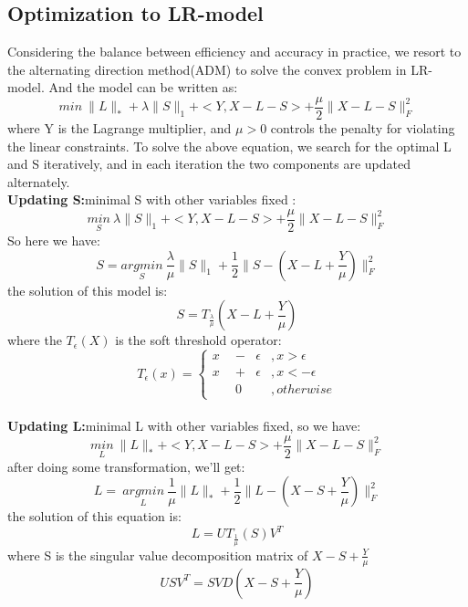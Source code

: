 \documentclass{article}
\begin{document}
\subsection{Optimization to LR-model}
Considering the balance between efficiency and accuracy in practice, we resort 
to the alternating direction method(ADM) to solve the convex problem in 
LR-model. And the model can be written as:
$$
min \ \|L\|_{*}+\lambda\|S\|_1+<Y,X-L-S>+\frac{\mu}{2} \|X-L-S\|^2_F
$$
where Y is the Lagrange multiplier, and $\mu>0$ controls the penalty for 
violating the linear constraints. To solve the above equation, we search for 
the optimal L and S iteratively, and in each iteration the two components are 
updated alternately.\\
\textbf{Updating S:}minimal S with other variables fixed :
$$
\underset{S}{min} \ \lambda\|S\|_1+<Y,X-L-S>+\frac{\mu}{2}\|X-L-S\|^2_F
$$
So here we have:
$$
S=\underset{S}{argmin} \ 
\frac{\lambda}{\mu}\|S\|_1+\frac{1}{2}\|S-(X-L+\frac{Y}{\mu})\|^2_F
$$
the solution of this model is:
$$
S=T_{\frac{\lambda}{\mu}}(X-L+\frac{Y}{\mu})
$$
where the $T_{\epsilon}(X)$ is the soft threshold operator:
$$ T_{\epsilon}(x)=
\left\{
\begin{aligned}
	x & \ \ - &\epsilon &, x>\epsilon\\
	x & \ \ + &\epsilon &, x<-\epsilon\\
	& \ \ 0 & \ &, otherwise
\end{aligned}
\right.
$$
\\
\textbf{Updating L:}minimal L with other variables fixed, so we have:
$$
\underset{L}{min}\ \|L\|_{*}+<Y, X-L-S>+\frac{\mu}{2}\|X-L-S\|^2_F
$$
after doing some transformation, we'll get:
$$
L=\ \underset{L}{argmin}\ 
\frac{1}{\mu}\|L\|_{*}+\frac{1}{2}\|L-(X-S+\frac{Y}{\mu})\|_F^2
$$
the solution of this equation is:
$$
L=UT_{\frac{1}{\mu}}(S)V^T
$$
where S is the singular value decomposition matrix of $X-S+\frac{Y}{\mu}$
$$
USV^T=SVD(X-S+\frac{Y}{\mu})
$$ 
\end{document}
